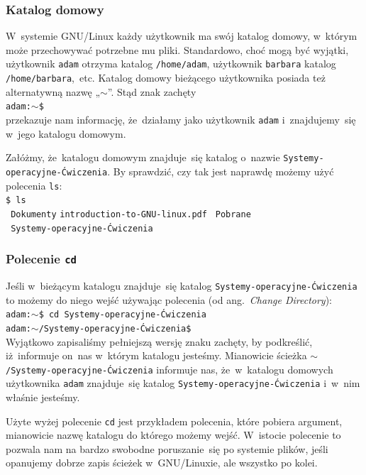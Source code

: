 \documentclass[10pt,t]{beamer}
\begin{document}
\begin{frame}
  \frametitle{Katalog domowy}


  W~systemie GNU/Linux każdy użytkownik ma swój katalog domowy, w~którym
  może przechowywać potrzebne mu pliki. Standardowo, choć mogą być wyjątki,
  użytkownik \texttt{adam} otrzyma katalog \texttt{/home/adam}, użytkownik
  \texttt{barbara} katalog \texttt{/home/barbara},~etc. Katalog domowy
  bieżącego użytkownika posiada też alternatywną nazwę „$\sim$”. Stąd znak
  zachęty \\
  \texttt{adam:$\sim$\$} \\
  przekazuje nam informację, że~działamy jako użytkownik \texttt{adam}
  i~znajdujemy~się w~jego katalogu domowym.

  Załóżmy, że~katalogu domowym znajduje~się katalog o~nazwie
  \texttt{Systemy-operacyjne-Ćwiczenia}. By sprawdzić, czy tak jest
  naprawdę możemy użyć polecenia \texttt{ls}: \\
  \texttt{\$ ls} \\
  \texttt{{\color{jAxisBlue} Dokumenty}} \quad
  \texttt{introduction-to-GNU-linux.pdf} \quad
  \texttt{{\color{jAxisBlue} Pobrane}} \\
  \texttt{{\color{jAxisBlue} Systemy-operacyjne-Ćwiczenia}} \\

\end{frame}





\begin{frame}
  \frametitle{Polecenie \texttt{cd}}


  Jeśli w~bieżącym katalogu znajduje~się katalog
  \texttt{Systemy-operacyjne-Ćwiczenia} to możemy do niego wejść
  używając polecenia
  (od ang.~\textit{Change Directory}): \\
  \texttt{adam:$\sim$\$ cd Systemy-operacyjne-Ćwiczenia} \\
  \texttt{adam:$\sim$/Systemy-operacyjne-Ćwiczenia\$} \\
  Wyjątkowo zapisaliśmy pełniejszą wersję znaku zachęty, by podkreślić,
  iż~informuje on~nas w~którym katalogu jesteśmy. Mianowicie ścieżka
  \texttt{$\sim$/Systemy-operacyjne-Ćwiczenia} informuje nas, że~w~katalogu
  domowych użytkownika \texttt{adam} znajduje~się katalog
  \texttt{Systemy-operacyjne-Ćwiczenia} i~w~nim właśnie jesteśmy.

  Użyte wyżej polecenie \texttt{cd} jest przykładem polecenia, które
  pobiera argument, mianowicie nazwę katalogu do którego możemy wejść.
  W~istocie polecenie to pozwala nam na bardzo swobodne poruszanie~się
  po systemie plików, jeśli opanujemy dobrze zapis ścieżek w~GNU/Linuxie,
  ale wszystko po kolei.

\end{frame}
\end{document}
